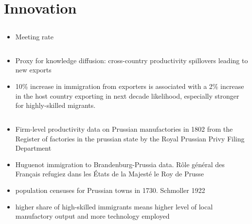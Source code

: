 \documentclass[10pt]{article} %
\begin{document}
\section{Innovation}
    \subsection{\cite{AghionHarrisHowittVickers2001}}
    
    \subsection{\cite{Prato2022}}
    \begin{itemize}
        \item Meeting rate
    \end{itemize}

    \subsection{\cite{BaharRapoport2018}}
    \begin{itemize}
        \item Proxy for knowledge diffusion: cross-country productivity spillovers leading to new exports
        \item 10\% increase in immigration from exporters is associated with a 2\% increase in the host country exporting in next decade likelihood, especially stronger for highly-skilled migrants.
    \end{itemize}

    \subsection{\cite{Hornung2014}}
    \begin{itemize}
        \item Firm-level productivity data on Prussian manufactories in 1802 from the Register of factories in the prussian state by the Royal Prussian Privy Filing Department
        \item Huguenot immigration to Brandenburg-Prussia data. Rôle général des Français refugiez dans les États de la Majesté le Roy de Prusse
        \item population censuses for Prussian towns in 1730. Schmoller 1922
        \item higher share of high-skilled immigrants means higher level of local manufactory output and more technology employed
    \end{itemize}
\end{document}
